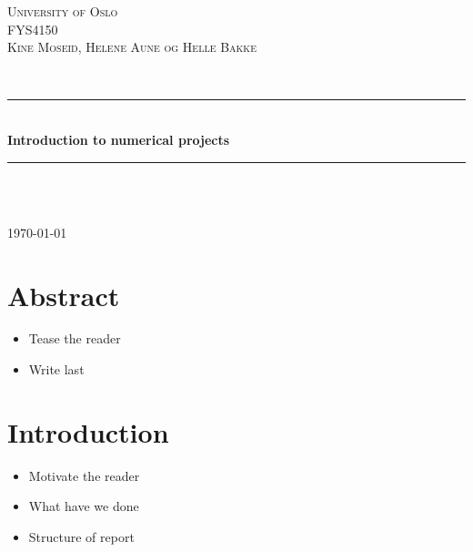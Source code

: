 \documentclass[12pt]{article}
\begin{document}
\begin{titlepage}

\newcommand{\HRule}{\rule{\linewidth}{0.5mm}} 
\center

\textsc{\LARGE University of Oslo}\\[1.5cm] 
\textsc{\Large FYS4150}\\[0.5cm] 
\textsc{\large Kine Moseid, Helene Aune og Helle Bakke}\\[0.5cm] 

\begin{minipage}{0.4\textwidth}
\end{minipage}\\[1cm]

\HRule \\[0.4cm]
{ \huge \bfseries Introduction to numerical projects}\\[0.4cm] 
\HRule \\[1.5cm]
 
\begin{minipage}{0.4\textwidth}
\end{minipage}\\[8cm]


{\large \today}\\[3cm] 
\vfill 

\end{titlepage}

\newpage
\tableofcontents

\newpage

\section{Abstract}

\begin{itemize}
\item Tease the reader
\item Write last
\end{itemize}

\section{Introduction}

\begin{itemize}
\item Motivate the reader
\item What have we done
\item Structure of report
\end{itemize}
\end{document}
